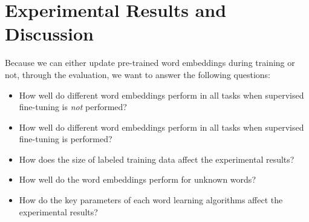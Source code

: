 

\section{Experimental Results and Discussion}



Because we can either update pre-trained word embeddings during training or not, through the evaluation, we want to answer the following questions:
\begin{itemize}
\item How well do different word embeddings perform in all tasks when supervised fine-tuning is \textit{not} performed?
\item How well do different word embeddings perform in all tasks when supervised fine-tuning is performed?
\item How does the size of labeled training data affect the experimental results?
\item How well do the word embeddings perform for unknown words? 
\item How do the key parameters of each word learning algorithms affect the experimental results?
\end{itemize}

